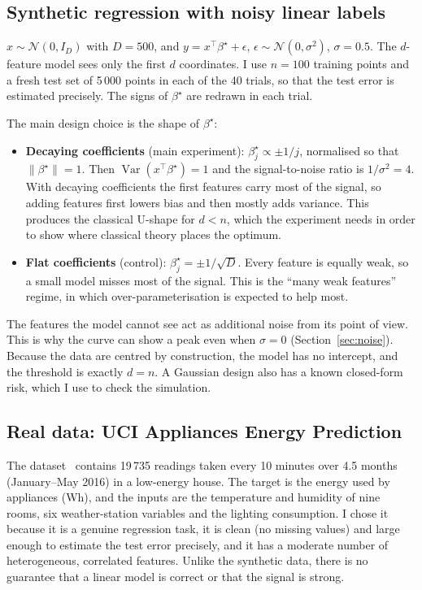 \documentclass[10pt,a4paper]{article}
\newcommand{\norm}[1]{\lVert #1 \rVert}
\begin{document}
\subsection{Synthetic regression with noisy linear labels}
$x\sim\mathcal N(0,I_D)$ with $D=500$, and $y = x^\top\beta^\star + \epsilon$, $\epsilon\sim\mathcal N(0,\sigma^2)$, $\sigma=0.5$. The $d$-feature model sees only the first $d$ coordinates. I use $n=100$ training points and a fresh test set of 5\,000 points in each of the 40 trials, so that the test error is estimated precisely. The signs of $\beta^\star$ are redrawn in each trial.

The main design choice is the shape of $\beta^\star$:
\begin{itemize}
  \item \textbf{Decaying coefficients} (main experiment): $\beta^\star_j \propto \pm 1/j$, normalised so that $\norm{\beta^\star}=1$. Then $\operatorname{Var}(x^\top\beta^\star)=1$ and the signal-to-noise ratio is $1/\sigma^2=4$. With decaying coefficients the first features carry most of the signal, so adding features first lowers bias and then mostly adds variance. This produces the classical U-shape for $d<n$, which the experiment needs in order to show where classical theory places the optimum.
  \item \textbf{Flat coefficients} (control): $\beta^\star_j = \pm1/\sqrt D$. Every feature is equally weak, so a small model misses most of the signal. This is the ``many weak features'' regime, in which over-parameterisation is expected to help most.
\end{itemize}
The features the model cannot see act as additional noise from its point of view. This is why the curve can show a peak even when $\sigma=0$ (Section~\ref{sec:noise}). Because the data are centred by construction, the model has no intercept, and the threshold is exactly $d=n$. A Gaussian design also has a known closed-form risk, which I use to check the simulation.

\subsection{Real data: UCI Appliances Energy Prediction}
The dataset~\cite{candanedo2017} contains 19\,735 readings taken every 10 minutes over 4.5 months (January--May 2016) in a low-energy house. The target is the energy used by appliances (Wh), and the inputs are the temperature and humidity of nine rooms, six weather-station variables and the lighting consumption. I chose it because it is a genuine regression task, it is clean (no missing values) and large enough to estimate the test error precisely, and it has a moderate number of heterogeneous, correlated features. Unlike the synthetic data, there is no guarantee that a linear model is correct or that the signal is strong.
\end{document}
